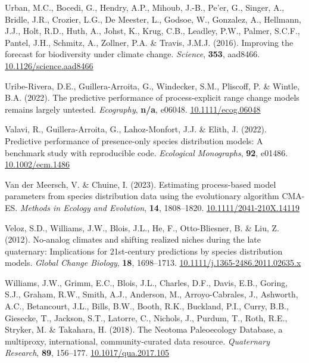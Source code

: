 \documentclass[11pt,]{article}
\newlength{\cslhangindent}
\newenvironment{CSLReferences}[2] %
 {%
  \setlength{\parindent}{0pt}
  \ifodd #1 \everypar{\setlength{\hangindent}{\cslhangindent}}\ignorespaces\fi
  \ifnum #2 > 0
  \setlength{\parskip}{#2\baselineskip}
  \fi
 }%
 {}
\begin{document}
\begin{CSLReferences}{1}{0}
\leavevmode{}%
Urban, M.C., Bocedi, G., Hendry, A.P., Mihoub, J.-B., Pe'er, G., Singer,
A., Bridle, J.R., Crozier, L.G., De Meester, L., Godsoe, W., Gonzalez,
A., Hellmann, J.J., Holt, R.D., Huth, A., Johst, K., Krug, C.B.,
Leadley, P.W., Palmer, S.C.F., Pantel, J.H., Schmitz, A., Zollner, P.A.
\& Travis, J.M.J. (2016). Improving the forecast for biodiversity under
climate change. \emph{Science}, \textbf{353}, aad8466.
\href{https://doi.org/10.1126/science.aad8466}{10.1126/science.aad8466}

\leavevmode{}%
Uribe-Rivera, D.E., Guillera-Arroita, G., Windecker, S.M., Pliscoff, P.
\& Wintle, B.A. (2022). The predictive performance of process-explicit
range change models remains largely untested. \emph{Ecography},
\textbf{n/a}, e06048.
\href{https://doi.org/10.1111/ecog.06048}{10.1111/ecog.06048}

\leavevmode{}%
Valavi, R., Guillera-Arroita, G., Lahoz-Monfort, J.J. \& Elith, J.
(2022). Predictive performance of presence-only species distribution
models: A benchmark study with reproducible code. \emph{Ecological
Monographs}, \textbf{92}, e01486.
\href{https://doi.org/10.1002/ecm.1486}{10.1002/ecm.1486}

\leavevmode{}%
Van der Meersch, V. \& Chuine, I. (2023). Estimating process-based model
parameters from species distribution data using the evolutionary
algorithm {CMA}-{ES}. \emph{Methods in Ecology and Evolution},
\textbf{14}, 1808--1820.
\href{https://doi.org/10.1111/2041-210X.14119}{10.1111/2041-210X.14119}

\leavevmode{}%
Veloz, S.D., Williams, J.W., Blois, J.L., He, F., Otto-Bliesner, B. \&
Liu, Z. (2012). No-analog climates and shifting realized niches during
the late quaternary: Implications for 21st-century predictions by
species distribution models. \emph{Global Change Biology}, \textbf{18},
1698--1713.
\href{https://doi.org/10.1111/j.1365-2486.2011.02635.x}{10.1111/j.1365-2486.2011.02635.x}

\leavevmode{}%
Williams, J.W., Grimm, E.C., Blois, J.L., Charles, D.F., Davis, E.B.,
Goring, S.J., Graham, R.W., Smith, A.J., Anderson, M., Arroyo-Cabrales,
J., Ashworth, A.C., Betancourt, J.L., Bills, B.W., Booth, R.K.,
Buckland, P.I., Curry, B.B., Giesecke, T., Jackson, S.T., Latorre, C.,
Nichols, J., Purdum, T., Roth, R.E., Stryker, M. \& Takahara, H. (2018).
The {Neotoma} {Paleoecology} {Database}, a multiproxy, international,
community-curated data resource. \emph{Quaternary Research},
\textbf{89}, 156--177.
\href{https://doi.org/10.1017/qua.2017.105}{10.1017/qua.2017.105}


\end{CSLReferences}
\end{document}
